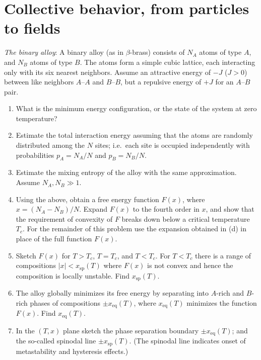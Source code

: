 \chapter{Collective behavior, from particles to fields}

\begin{problem}
    \textit{The binary alloy}: A binary alloy (as in $\beta$-brass) consists of $N_A$ atoms of type $A$, and $N_B$ atoms of type $B$. The atoms form a simple cubic lattice, each interacting only with its six nearest neighbors. Assume an attractive energy of $-J$ ($J>0$) between like neighbors $A$--$A$ and $B$--$B$, but a repulsive energy of $+J$ for an $A$--$B$ pair.

    \begin{enumerate}
        \item[(a)] What is the minimum energy configuration, or the state of the system at zero temperature?

        \item[(b)] Estimate the total interaction energy assuming that the atoms are randomly distributed among the $N$ sites; i.e.\ each site is occupied independently with probabilities $p_A = N_A/N$ and $p_B = N_B/N$.

        \item[(c)] Estimate the mixing entropy of the alloy with the same approximation. Assume $N_A, N_B \gg 1$.

        \item[(d)] Using the above, obtain a free energy function $F(x)$, where $x = (N_A - N_B)/N$. Expand $F(x)$ to the fourth order in $x$, and show that the requirement of convexity of $F$ breaks down below a critical temperature $T_c$. For the remainder of this problem use the expansion obtained in (d) in place of the full function $F(x)$.

        \item[(e)] Sketch $F(x)$ for $T > T_c$, $T = T_c$, and $T < T_c$. For $T < T_c$ there is a range of compositions $|x| < x_{\text{sp}}(T)$ where $F(x)$ is not convex and hence the composition is locally unstable. Find $x_{\text{sp}}(T)$.

        \item[(f)] The alloy globally minimizes its free energy by separating into $A$-rich and $B$-rich phases of compositions $\pm x_{\text{eq}}(T)$, where $x_{\text{eq}}(T)$ minimizes the function $F(x)$. Find $x_{\text{eq}}(T)$.

        \item[(g)] In the $(T, x)$ plane sketch the phase separation boundary $\pm x_{\text{eq}}(T)$; and the so-called spinodal line $\pm x_{\text{sp}}(T)$. (The spinodal line indicates onset of metastability and hysteresis effects.)
    \end{enumerate}
\end{problem}

